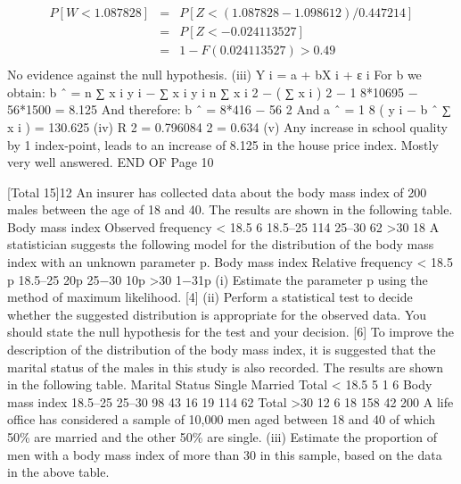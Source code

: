 \documentclass[a4paper,12pt]{article}
\begin{document}
\begin{enumerate}
\begin{eqnarray*}
P [ W < 1.087828 ] &=& P [ Z < ( 1.087828 − 1.098612) / 0.447214]\\
&=& P [ Z < − 0.024113527 ] \\ &=& 1 − F (0.024113527) > 0.49\\
\end{eqnarray*}
No evidence against the null hypothesis.
(iii)
Y i = a + bX i + ε i
{
For b we obtain: b ˆ = n ∑ x i y i −
∑ x i \sum y i } { n ∑ x i 2 − ( ∑ x i ) 2 }
− 1
8*10695 − 56*1500
= 8.125
And therefore: b ˆ =
8*416 − 56 2
And a ˆ =
1
8
( \sum y i − b ˆ ∑ x i ) = 130.625
(iv) R 2 = 0.796084 2 = 0.634
(v) Any increase in school quality by 1 index-point, leads to an increase of 8.125
in the house price index.
Mostly very well answered.
END OF %
Page 10

[Total 15]12
An insurer has collected data about the body mass index of 200 males between the
age of 18 and 40. The results are shown in the following table.
Body mass index
Observed frequency
< 18.5
6
18.5–25
114
25–30
62
>30
18
A statistician suggests the following model for the distribution of the body mass index
with an unknown parameter p.
Body mass index
Relative frequency
< 18.5
p
18.5–25
20p
25−30
10p
>30
1−31p
(i) Estimate the parameter p using the method of maximum likelihood.
[4]
(ii) Perform a statistical test to decide whether the suggested distribution is
appropriate for the observed data. You should state the null hypothesis for the
test and your decision.
[6]
To improve the description of the distribution of the body mass index, it is suggested
that the marital status of the males in this study is also recorded. The results are
shown in the following table.
Marital Status
Single
Married
Total
< 18.5
5
1
6
Body mass index
18.5–25
25–30
98
43
16
19
114
62
Total
>30
12
6
18
158
42
200
A life office has considered a sample of 10,000 men aged between 18 and 40 of which 50\% are married and the other 50\% are single.
(iii) Estimate the proportion of men with a body mass index of more than 30 in this sample, based on the data in the above table.


\end{enumerate}
\end{document}
